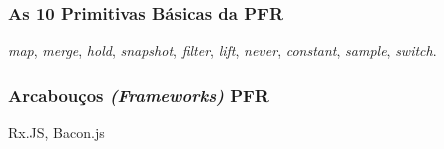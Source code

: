 \subsubsection{As 10 Primitivas Básicas da PFR}
\label{sec:pfr-10-primitivas}

\emph{map}, \emph{merge}, \emph{hold}, \emph{snapshot}, \emph{filter},
\emph{lift}, \emph{never}, \emph{constant}, \emph{sample}, \emph{switch}.


\subsubsection{Arcabouços \emph{(Frameworks)} PFR}
\label{sec:pfr-frameworks}

Rx.JS, Bacon.js

